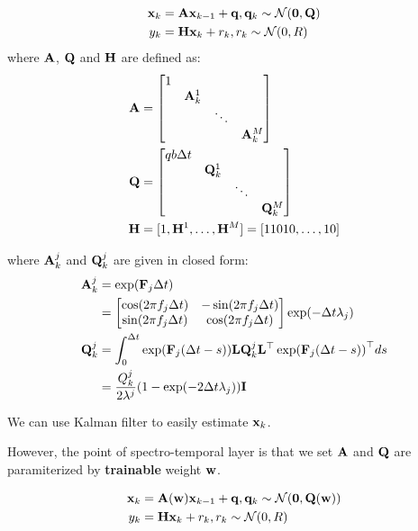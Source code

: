 \documentclass[11pt,a4paper]{article}
\begin{document}
\begin{equation}
\begin{split}
\cu{x}_k & = \cu{A}\cu{x}_{k-1} + \cu{q}, \hfill \cu{q}_k\sim\mathcal{N}(\cu{0},\cu{Q})\\
y_k &= \cu{H}\cu{x}_k + r_k, \hfill r_k\sim\mathcal{N}(0, R)
\end{split}
\label{equ:osc-model}
\end{equation}
where $\mathbf{A}$, $\mathbf{Q}$ and $\mathbf{H}$ are defined as:
\begin{align}
\mathbf{A} &= \begin{bmatrix}
1 & & &\\
& \mathbf{A}^1_k & &\\
& & \ddots &\\
& & & \mathbf{A}^M_k
\end{bmatrix}\\
\mathbf{Q} &= \begin{bmatrix}
qb \Delta t & & &\\
& \mathbf{Q}^1_k & & \\
& & \ddots & \\
& & & \mathbf{Q}^M_k
\end{bmatrix}\\
\mathbf{H} &= [1, \mathbf{H}^1, \ldots, \mathbf{H}^M] = [1 1 0 1 0, \ldots, 1 0]
\label{equ:osc-a-q-h}
\end{align}  

where $\mathbf{A}^j_k$ and $\mathbf{Q}^j_k$ are given in closed form:
\begin{align}
\mathbf{A}^j_k &= \exp(\mathbf{F}_j\Delta t)\\
&= \begin{bmatrix}
\cos (2\pi f_j\Delta t) & -\sin (2\pi f_j\Delta t)\\
\sin (2\pi f_j\Delta t) & \cos (2\pi f_j\Delta t)
\end{bmatrix}\exp(-\Delta t \lambda_j)\\
\mathbf{Q}^j_k &= \int_0^{\Delta t} \exp(\mathbf{F}_j(\Delta t-s)) \mathbf{L}\mathbf{Q}^j_k\mathbf{L}^\top \exp(\mathbf{F}_j(\Delta t-s))^\top ds\\
&= \frac{Q^j_k}{2\lambda^j}(1 - \exp(-2\Delta t \lambda_j)) \mathbf{I}
\label{equ:osc-solve}
\end{align}

We can use Kalman filter to easily estimate $\mathbf{x}_k$. 

However, the point of spectro-temporal layer is that we set $\mathbf{A}$ and $\mathbf{Q}$ are paramiterized by \textbf{trainable} weight $\mathbf{w}$. 

\begin{equation}
\begin{split}
\cu{x}_k & = \cu{A}(\cu{w})\cu{x}_{k-1} + \cu{q}, \hfill \cu{q}_k\sim\mathcal{N}(\cu{0},\cu{Q}(\cu{w}))\\
y_k &= \cu{H}\cu{x}_k + r_k, \hfill r_k\sim\mathcal{N}(0, R)
\end{split}
\label{equ:osc-model}
\end{equation}
\end{document}
